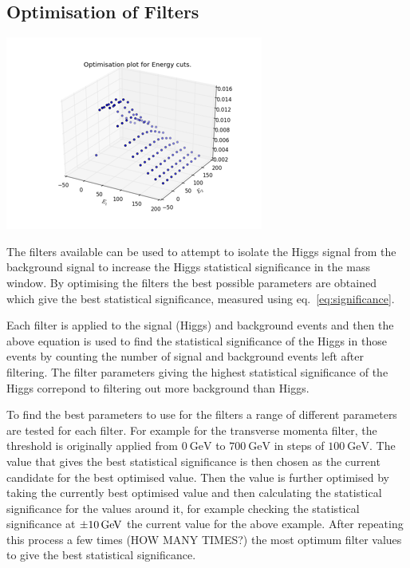 \documentclass[11pt]{amsart}
\newenvironment{Figure}
  {\par\medskip\noindent\minipage{\linewidth}}
  {\endminipage\par\medskip}
\begin{document}
\begin{multicols}{2}
\section{Optimisation of Filters}
\label{sec:optimisation}

\begin{Figure}
  \centering
  \includegraphics[width=\linewidth]{energy}
  \label{fig:energy}
\end{Figure}

The filters available can be used to attempt to isolate the Higgs signal from the background signal to increase the Higgs statistical significance in the mass window. By optimising the filters the best possible parameters are obtained which give the best statistical significance, measured using eq.~\ref{eq:significance}.

Each filter is applied to the signal (Higgs) and background events and then the above equation is used to find the statistical significance of the Higgs in those events by counting the number of signal and background events left after filtering. The filter parameters giving the highest statistical significance of the Higgs correpond to filtering out more background than Higgs.

To find the best parameters to use for the filters a range of different parameters are tested for each filter. For example for the transverse momenta filter, the threshold is originally applied from $\SI{0}{\giga\electronvolt}$ to $\SI{700}{\giga\electronvolt}$ in steps of $\SI{100}{\giga\electronvolt}$. The value that gives the best statistical significance is then chosen as the current candidate for the best optimised value. Then the value is further optimised by taking the currently best optimised value and then calculating the statistical significance for the values around it, for example checking the statistical significance at $\SI{\pm10}{\giga\electronvolt}$ the current value for the above example. After repeating this process a few times (HOW MANY TIMES?) the most optimum filter values to give the best statistical significance.


\end{multicols}
\end{document}
